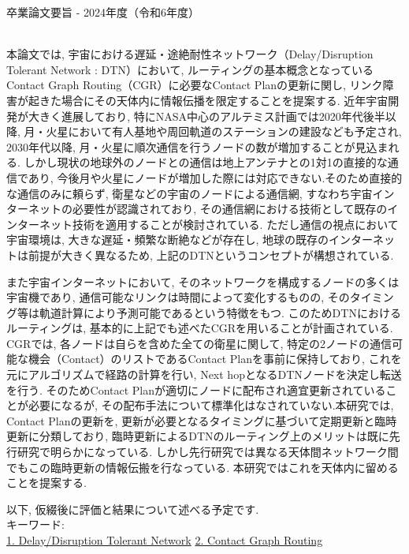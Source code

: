 卒業論文要旨 - 2024年度（令和6年度）
\begin{center}
\begin{large}
\end{large}
\end{center}

~ \\
本論文では, 宇宙における遅延・途絶耐性ネットワーク（Delay/Disruption Tolerant Network : DTN）において, 
ルーティングの基本概念となっているContact Graph Routing（CGR）に必要なContact Planの更新に関し, 
リンク障害が起きた場合にその天体内に情報伝播を限定することを提案する.
近年宇宙開発が大きく進展しており, 特にNASA中心のアルテミス計画では2020年代後半以降, 
月・火星において有人基地や周回軌道のステーションの建設なども予定され, 
2030年代以降, 月・火星に順次通信を行うノードの数が増加することが見込まれる.
しかし現状の地球外のノードとの通信は地上アンテナとの1対1の直接的な通信であり, 
今後月や火星にノードが増加した際には対応できない.そのため直接的な通信のみに頼らず, 
衛星などの宇宙のノードによる通信網, すなわち宇宙インターネットの必要性が認識されており, 
その通信網における技術として既存のインターネット技術を適用することが検討されている.
ただし通信の視点において宇宙環境は, 大きな遅延・頻繁な断絶などが存在し, 
地球の既存のインターネットは前提が大きく異なるため, 
上記のDTNというコンセプトが構想されている.

また宇宙インターネットにおいて, そのネットワークを構成するノードの多くは宇宙機であり, 
通信可能なリンクは時間によって変化するものの, そのタイミング等は軌道計算により予測可能であるという特徴をもつ.
このためDTNにおけるルーティングは, 基本的に上記でも述べたCGRを用いることが計画されている.
CGRでは, 各ノードは自らを含めた全ての衛星に関して, 
特定の2ノードの通信可能な機会（Contact）のリストであるContact Planを事前に保持しており, 
これを元にアルゴリズムで経路の計算を行い, Next hopとなるDTNノードを決定し転送を行う.
そのためContact Planが適切にノードに配布され適宜更新されていることが必要になるが, 
その配布手法について標準化はなされていない.本研究では, Contact Planの更新を, 
更新が必要となるタイミングに基づいて定期更新と臨時更新に分類しており, 
臨時更新によるDTNのルーティング上のメリットは既に先行研究で明らかになっている.
しかし先行研究では異なる天体間ネットワーク間でもこの臨時更新の情報伝搬を行なっている.
本研究ではこれを天体内に留めることを提案する.

以下, 仮綴後に評価と結果について述べる予定です.
~ \\


キーワード:\\
\underline{1. Delay/Disruption Tolerant Network} 
\underline{2. Contact Graph Routing} 
\begin{flushright}
\dept \\
\author
\end{flushright}
